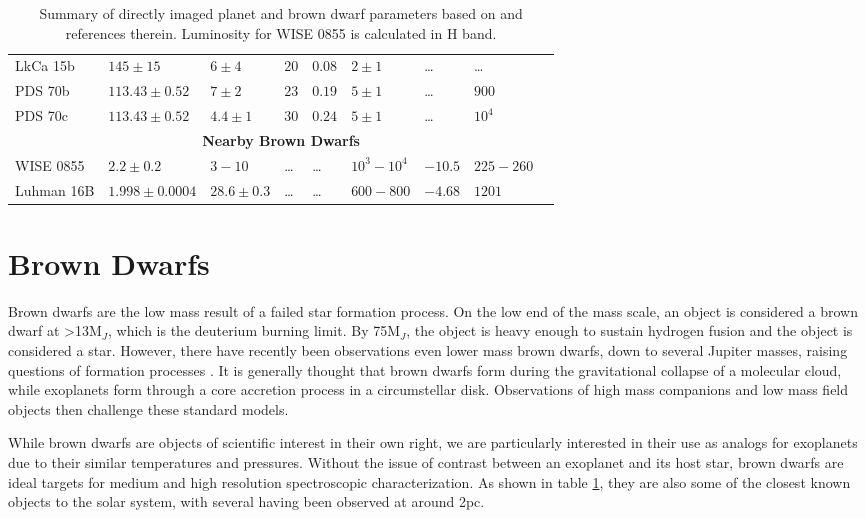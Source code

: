 \begin{landscape}
\begin{table}[t]
\begin{small}
\begin{tabular}{lllllllll}
				LkCa 15b  & $145\pm15$    & $6\pm4$     & $20$ & $0.08$ & $2\pm1$ & \ldots & \ldots &\\
				PDS 70b   & $113.43\pm0.52$ & $7\pm2$   & $23$ & $0.19$ & $5\pm1$ & \ldots & $900$ &\parencite{Haffert2019}\\
				PDS 70c   & $113.43\pm0.52$ & $4.4\pm1$ & $30$ & $0.24$ & $5\pm1$ & \ldots &  $10^{4}$ & \parencite{Haffert2019}\\
				\midrule
				\multicolumn{9}{c}{\textbf{Nearby Brown Dwarfs}}\\
				\midrule
				WISE 0855   & $2.2\pm0.2$ & $3-10$ & \ldots & \ldots & $10^{3}-10^{4}$ & $-10.5$ &  $225-260$ & \parencite{Luhman2014,Tinney2014}\\
				Luhman 16B   & $1.998\pm0.0004$ & $28.6\pm0.3$ & \ldots & \ldots & $600-800$ & $-4.68$&  $1201$ & \parencite{Sahlmann2015,Garcia2017}\\
				\bottomrule
			\end{tabular}
		\end{small}
		\caption{Summary of directly imaged planet and brown dwarf parameters based on \parencite{Bowler2016} and references therein. Luminosity for WISE 0855 is calculated in H band.}
		\label{tab:exoplanetparams}
	\end{table}
\end{landscape}
\section{Brown Dwarfs}
Brown dwarfs are the low mass result of a failed star formation process.
On the low end of the mass scale, an object is considered a brown dwarf at >13M$_{J}$, which is the deuterium burning limit.
By 75M$_{J}$, the object is heavy enough to sustain hydrogen fusion and the object is considered a star.
However, there have recently been observations even lower mass brown dwarfs, down to several Jupiter masses, raising questions of formation processes \parencite{Luhman2014}.
It is generally thought that brown dwarfs form during the gravitational collapse of a molecular cloud, while exoplanets form through a core accretion process in a circumstellar disk.
Observations of high mass companions and low mass field objects then challenge these standard models.

While brown dwarfs are objects of scientific interest in their own right, we are particularly interested in their use as analogs for exoplanets due to their similar temperatures and pressures.
Without the issue of contrast between an exoplanet and its host star, brown dwarfs are ideal targets for medium and high resolution spectroscopic characterization.
As shown in table \ref{tab:exoplanetparams}, they are also some of the closest known objects to the solar system, with several having been observed at around 2pc.

